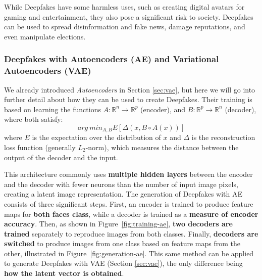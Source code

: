 \documentclass[preprint]{elsarticle}
\begin{document}
While Deepfakes have some harmless uses, such as creating digital avatars for gaming and entertainment, they also pose a significant risk to society. 
Deepfakes can be used to spread disinformation and fake news, damage reputations, and even manipulate elections.

\subsubsection{Deepfakes with Autoencoders (AE) and Variational Autoencoders (VAE)} \label{sec:deep-vae}
We already introduced \emph{Autoencoders} \cite{bank2021autoencoders} in Section \ref{sec:vae}, 
but here we will go into further detail 
about how they can be used to create Deepfakes.
Their training is based on learning the functions $A : \mathbb{R}^n \rightarrow \mathbb{R}^p$ (encoder), 
and $B:\mathbb{R}^p \rightarrow \mathbb{R}^n$ (decoder), where both satisfy:
\begin{equation}
	arg~min_{A,B}E[\Delta(x,B \circ A(x))]
\end{equation}
where $E$ is the expectation over the distribution of $x$ and $\Delta$ is the reconstruction loss function (generally
$L_2$-norm), which measures the distance between the output of the decoder and the input.



This architecture commonly uses \textbf{multiple hidden layers} between the encoder and the decoder 
with fewer neurons than the number of input image pixels, creating a latent image representation. 
The generation of Deepfakes with AE consists of three significant steps.
First, an encoder is trained to produce feature maps for \textbf{both faces class}, while a decoder is trained as a \textbf{measure of encoder accuracy}. 
Then, as shown in Figure~\ref{fig:training-ae}, \textbf{two decoders are trained} separately to reproduce images from both classes. Finally, \textbf{decoders are switched} to produce
images from one class based on feature maps from the other, illustrated in Figure~\ref{fig:generation-ae}.
This same method can be applied to generate Deepfakes with VAE (Section \ref{sec:vae}), the only difference being \textbf{how the latent
	vector is obtained}.
\end{document}
